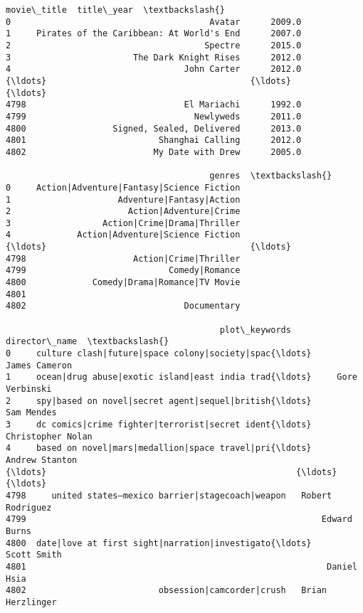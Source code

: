             \begin{tcolorbox}[breakable, size=fbox, boxrule=.5pt, pad at break*=1mm, opacityfill=0]
\begin{Verbatim}[commandchars=\\\{\}]
                                   movie\_title  title\_year  \textbackslash{}
0                                       Avatar      2009.0
1     Pirates of the Caribbean: At World's End      2007.0
2                                      Spectre      2015.0
3                        The Dark Knight Rises      2012.0
4                                  John Carter      2012.0
{\ldots}                                        {\ldots}         {\ldots}
4798                               El Mariachi      1992.0
4799                                 Newlyweds      2011.0
4800                 Signed, Sealed, Delivered      2013.0
4801                          Shanghai Calling      2012.0
4802                         My Date with Drew      2005.0

                                        genres  \textbackslash{}
0     Action|Adventure|Fantasy|Science Fiction
1                     Adventure|Fantasy|Action
2                       Action|Adventure|Crime
3                  Action|Crime|Drama|Thriller
4             Action|Adventure|Science Fiction
{\ldots}                                        {\ldots}
4798                     Action|Crime|Thriller
4799                            Comedy|Romance
4800             Comedy|Drama|Romance|TV Movie
4801
4802                               Documentary

                                          plot\_keywords      director\_name  \textbackslash{}
0     culture clash|future|space colony|society|spac{\ldots}      James Cameron
1     ocean|drug abuse|exotic island|east india trad{\ldots}     Gore Verbinski
2     spy|based on novel|secret agent|sequel|british{\ldots}         Sam Mendes
3     dc comics|crime fighter|terrorist|secret ident{\ldots}  Christopher Nolan
4     based on novel|mars|medallion|space travel|pri{\ldots}     Andrew Stanton
{\ldots}                                                 {\ldots}                {\ldots}
4798     united states–mexico barrier|stagecoach|weapon   Robert Rodriguez
4799                                                          Edward Burns
4800  date|love at first sight|narration|investigato{\ldots}        Scott Smith
4801                                                           Daniel Hsia
4802                          obsession|camcorder|crush   Brian Herzlinger


\end{Verbatim}
\end{tcolorbox}

